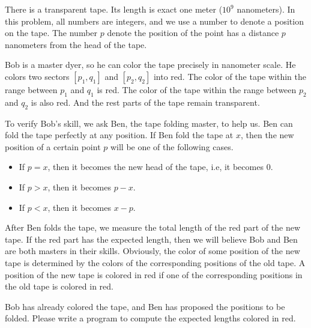 There is a transparent tape. Its length is exact one meter ($10^9$ nanometers).
In this problem, all numbers are integers, and we use a number to denote 
a position on the tape. The number $p$ denote the position of the point
has a distance $p$ nanometers from the head of the tape.

Bob is a master dyer, so he can color the tape precisely in nanometer scale.
He colors two sectors $[p_1,q_1]$ and $[p_2,q_2]$ into red. 
The color of the tape within the range between $p_1$ and $q_1$ is red. 
The color of the tape within the range between $p_2$ and $q_2$ is also red. 
And the rest parts of the tape remain transparent. 

To verify Bob's skill, we ask Ben, the tape folding master, to help us.
Ben can fold the tape perfectly at any position. 
If Ben fold the tape at $x$, then the new position of a certain point $p$ 
will be one of the following cases.
\begin{itemize}
\tightlist
\item If $p=x$, then it becomes the new head of the tape, i.e, it becomes $0$.
\item If $p>x$, then it becomes $p-x$.
\item If $p<x$, then it becomes $x-p$. 
\end{itemize}
After Ben folds the tape, we measure the total length of the red part of the
new tape. 
If the red part has the expected length, then we will believe Bob and Ben
are both masters in their skills.
Obviously, the color of some position of the new tape is determined by the 
colors of the corresponding positions of the old tape. 
A position of the new tape is colored in red if one of the corresponding 
positions in the old tape is colored in red. 

Bob has already colored the tape, and Ben has proposed the positions to be
folded. 
Please write a program to compute the expected lengths colored in red.
